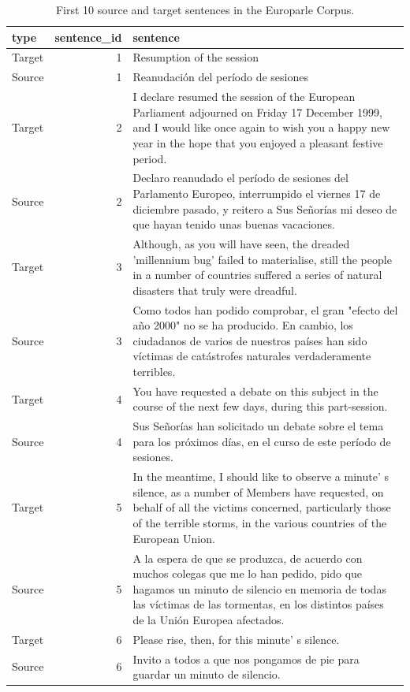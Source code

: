 \documentclass[
]{article}
\begin{document}
\begin{table}

\caption{\label{tab:structure-europarle}First 10 source and target sentences in the Europarle Corpus.}
\centering
\begin{tabular}[t]{lrl}
\toprule
type & sentence\_id & sentence\\
\midrule
Target & 1 & Resumption of the session\\
Source & 1 & Reanudación del período de sesiones\\
Target & 2 & I declare resumed the session of the European Parliament adjourned on Friday 17 December 1999, and I would like once again to wish you a happy new year in the hope that you enjoyed a pleasant festive period.\\
Source & 2 & Declaro reanudado el período de sesiones del Parlamento Europeo, interrumpido el viernes 17 de diciembre pasado, y reitero a Sus Señorías mi deseo de que hayan tenido unas buenas vacaciones.\\
Target & 3 & Although, as you will have seen, the dreaded 'millennium bug' failed to materialise, still the people in a number of countries suffered a series of natural disasters that truly were dreadful.\\
\addlinespace
Source & 3 & Como todos han podido comprobar, el gran "efecto del año 2000" no se ha producido. En cambio, los ciudadanos de varios de nuestros países han sido víctimas de catástrofes naturales verdaderamente terribles.\\
Target & 4 & You have requested a debate on this subject in the course of the next few days, during this part-session.\\
Source & 4 & Sus Señorías han solicitado un debate sobre el tema para los próximos días, en el curso de este período de sesiones.\\
Target & 5 & In the meantime, I should like to observe a minute' s silence, as a number of Members have requested, on behalf of all the victims concerned, particularly those of the terrible storms, in the various countries of the European Union.\\
Source & 5 & A la espera de que se produzca, de acuerdo con muchos colegas que me lo han pedido, pido que hagamos un minuto de silencio en memoria de todas las víctimas de las tormentas, en los distintos países de la Unión Europea afectados.\\
\addlinespace
Target & 6 & Please rise, then, for this minute' s silence.\\
Source & 6 & Invito a todos a que nos pongamos de pie para guardar un minuto de silencio.\\

\end{tabular}
\end{table}
\end{document}
